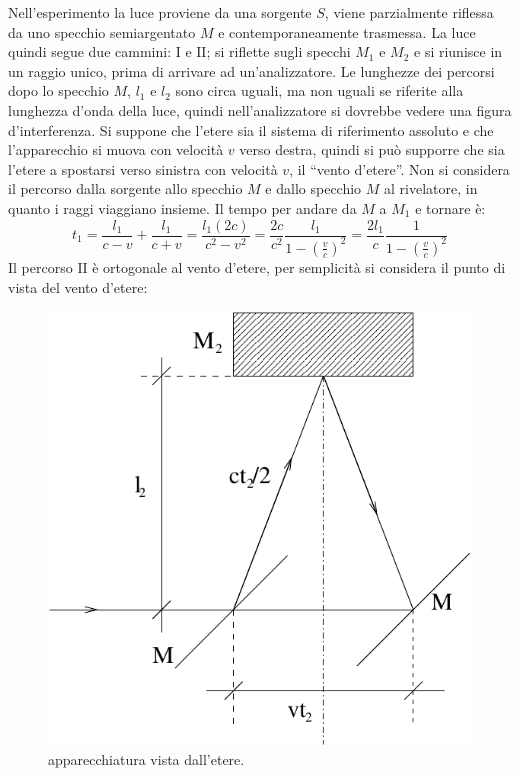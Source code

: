 Nell'esperimento la luce proviene da una sorgente $S$, viene parzialmente riflessa da uno specchio semiargentato $M$ e contemporaneamente trasmessa. La luce quindi segue due cammini: $\text{I}$ e $\text{II}$; si riflette sugli specchi $M_1$ e $M_2$ e si riunisce in un raggio unico, prima di arrivare ad un'analizzatore. Le lunghezze dei percorsi dopo lo specchio $M$, $l_1$ e $l_2$ sono circa uguali, ma non uguali se riferite alla lunghezza d'onda della luce, quindi nell'analizzatore si dovrebbe vedere una figura d'interferenza. Si suppone che l'etere sia il sistema di riferimento assoluto e che l'apparecchio si muova con velocità $v$ verso destra, quindi si può supporre che sia l'etere a spostarsi verso sinistra con velocità $v$, il ``vento d'etere''. Non si considera il percorso dalla sorgente allo specchio $M$ e dallo specchio $M$ al rivelatore, in quanto i raggi viaggiano insieme. Il tempo per andare da $M$ a $M_1$ e tornare è:
\[t_1=\frac{l_1}{c-v}+\frac{l_1}{c+v}=\frac{l_1(2c)}{c^2-v^2}=\frac{2c}{c^2}\frac{l_1}{1-\left(\frac{v}{c}\right)^2}=\frac{2l_1}{c}\frac{1}{1-\left(\frac{v}{c}\right)^2}\]
Il percorso $\text{II}$ è ortogonale al vento d'etere, per semplicità si considera il punto di vista del vento d'etere:
\begin{figure}[htbp]
   \centering
   \includegraphics[scale=0.8]{immagini/fisica1/Morley2}
   \caption{apparecchiatura vista dall'etere.}
\end{figure}

